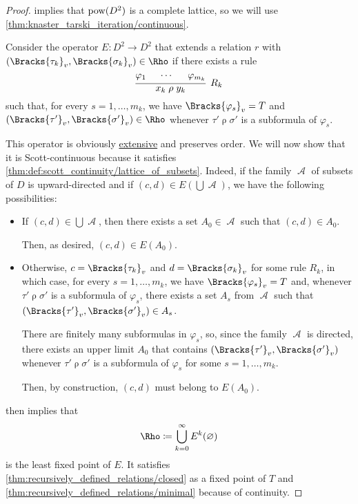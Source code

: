 \begin{proof}
   implies that \( \operatorname{pow}(D^2) \) is a complete lattice, so we will use \cref{thm:knaster_tarski_iteration/continuous}.

  Consider the operator \( E: D^2 \to D^2 \) that extends a relation \( r \) with \( (\Bracks{\tau_k}_v, \Bracks{\sigma_k}_v) \in \Rho \) if there exists a rule
  \begin{equation*}
    \begin{prooftree}
      \hypo{ \varphi_1 }
      \hypo{ \cdots }
      \hypo{ \varphi_{m_k} }
      \infer3[\( R_k \)]{ x_k \mathrel{\rho} y_k },
    \end{prooftree}
  \end{equation*}
  such that, for every \( s = 1, \ldots, m_k \), we have \( \Bracks{\varphi_s}_v = T \) and \( (\Bracks{\tau'}_v, \Bracks{\sigma'}_v) \in \Rho \) whenever \( \tau' \mathrel{\rho} \sigma' \) is a subformula of \( \varphi_s \).

  This operator is obviously \hyperref[def:extensive_function]{extensive} and preserves order. We will now show that it is Scott-continuous because it satisfies \cref{thm:def:scott_continuity/lattice_of_subsets}. Indeed, if the family \( \mscrA \) of subsets of \( D \) is upward-directed and if \( (c, d) \in E(\bigcup \mscrA) \), we have the following possibilities:
  \begin{itemize}
    \item If \( (c, d) \in \bigcup \mscrA \), then there exists a set \( A_0 \in \mscrA \) such that \( (c, d) \in A_0 \).

    Then, as desired, \( (c, d) \in E(A_0) \).

    \item Otherwise, \( c = \Bracks{\tau_k}_v \) and \( d = \Bracks{\sigma_k}_v \) for some rule \( R_k \), in which case, for every \( s = 1, \ldots, m_k \), we have \( \Bracks{\varphi_s}_v = T \) and, whenever \( \tau' \mathrel{\rho} \sigma' \) is a subformula of \( \varphi_s \), there exists a set \( A_s \) from \( \mscrA \) such that \( (\Bracks{\tau'}_v, \Bracks{\sigma'}_v) \in A_s \).

    There are finitely many subformulas in \( \varphi_s \), so, since the family \( \mscrA \) is directed, there exists an upper limit \( A_0 \) that contains \( (\Bracks{\tau'}_v, \Bracks{\sigma'}_v) \) whenever \( \tau' \mathrel{\rho} \sigma' \) is a subformula of \( \varphi_s \) for some \( s = 1, \ldots, m_k \).

    Then, by construction, \( (c, d) \) must belong to \( E(A_0) \).
  \end{itemize}

   then implies that
  \begin{equation*}
    \Rho \coloneqq \bigcup_{k=0}^\infty E^k(\varnothing)
  \end{equation*}
  is the least fixed point of \( E \). It satisfies \cref{thm:recursively_defined_relations/closed} as a fixed point of \( T \) and \cref{thm:recursively_defined_relations/minimal} because of continuity.
\end{proof}

